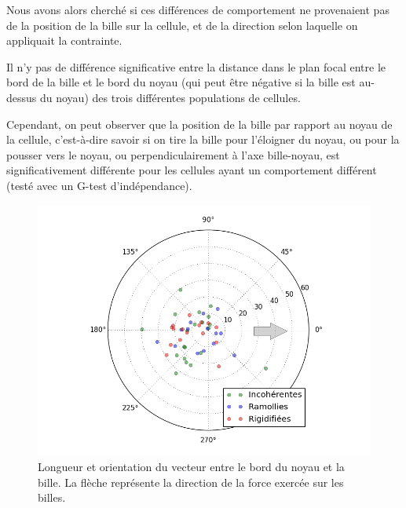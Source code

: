 Nous avons alors cherché si ces différences de comportement ne provenaient pas de la position de la bille sur la cellule, et de la direction selon laquelle on appliquait la contrainte. 

Il n'y pas de différence significative entre la distance dans le plan focal entre le bord de la bille et le bord du noyau (qui peut être négative si la bille est au-dessus du noyau) des trois différentes populations de cellules. 

Cependant, on peut observer que la position de la bille par rapport au noyau de la cellule, c'est-à-dire savoir si on tire la bille pour l'éloigner du noyau, ou pour la pousser vers le noyau, ou perpendiculairement à l'axe bille-noyau, est significativement différente pour les cellules ayant un comportement différent (testé avec un G-test d'indépendance). 
\begin{figure}
\includegraphics[scale=0.5]{Figures/Positions_FRI.png} 
\caption{Longueur et orientation du vecteur entre le bord du noyau et la bille. La flèche représente la direction de la force exercée sur les billes.}
\end{figure}
